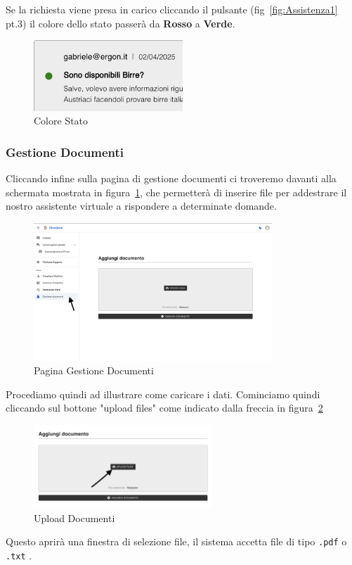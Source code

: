 Se la richiesta viene presa in carico cliccando il pulsante (fig~\ref{fig:Assistenza1} pt.3) il colore dello stato passerà da \textbf{Rosso} a \textbf{Verde}.
\begin{figure}[h!]
    \centering
    \includegraphics[width=0.5\textwidth]{./img/Assistenza2.png}
    \caption{Colore Stato}
\end{figure}

\subsubsection{Gestione Documenti}
Cliccando infine sulla pagina di gestione documenti ci troveremo davanti alla schermata mostrata in figura~\ref{fig:gestione1}, che permetterà di inserire file per addestrare il nostro assistente virtuale a rispondere a determinate domande.
\begin{figure}[h!]
    \centering
    \includegraphics[width=0.8\textwidth]{./img/PaginaGestioneDocumenti1.png}
    \caption{Pagina Gestione Documenti}
    \label{fig:gestione1}
\end{figure}

Procediamo quindi ad illustrare come caricare i dati. Cominciamo quindi cliccando sul bottone "upload files" come indicato dalla freccia in figura~\ref{fig:gestione2}
\begin{figure}[h!]
    \centering
    \includegraphics[width=0.6\textwidth]{./img/PaginaGestioneDocumenti2.png}
    \caption{Upload Documenti}
    \label{fig:gestione2}
\end{figure}
Questo aprirà una finestra di selezione file, il sistema accetta file di tipo \texttt{.pdf} o \texttt{.txt} .
 

